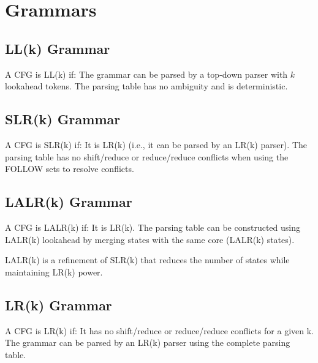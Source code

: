 \section{Grammars}

\subsection{LL(k) Grammar}
A CFG is LL(k) if:
The grammar can be parsed by a top-down parser with $k$ lookahead tokens.
The parsing table has no ambiguity and is deterministic.

\subsection{SLR(k) Grammar}
A CFG is SLR(k) if:
It is LR(k) (i.e., it can be parsed by an LR(k) parser).
The parsing table has no shift/reduce or reduce/reduce conflicts when using the FOLLOW sets to resolve conflicts.


\subsection{LALR(k) Grammar}
A CFG is LALR(k) if:
It is LR(k).
The parsing table can be constructed using LALR(k) lookahead by merging states with the same core (LALR(k) states).

LALR(k) is a refinement of SLR(k) that reduces the number of states while maintaining LR(k) power.

\subsection{LR(k) Grammar}
A CFG is LR(k) if:
It has no shift/reduce or reduce/reduce conflicts for a given k.
The grammar can be parsed by an LR(k) parser using the complete parsing table.
